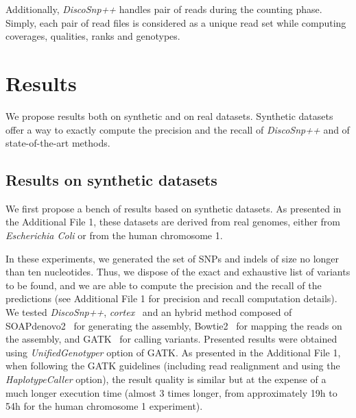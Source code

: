 \documentclass{bmcart}
\newcommand{\discopp}{{\it DiscoSnp++}\xspace}
\newcommand{\co}{{\it cortex}\xspace}
\begin{document}
Additionally, \discopp handles pair of reads during the counting phase. Simply, each pair of read files is considered as a unique read set while computing coverages, qualities, ranks and genotypes. 


\section*{Results}

We propose results both on synthetic and on real datasets. Synthetic datasets offer a way to exactly compute the precision and the recall of \discopp and of state-of-the-art methods. 

\subsection*{Results on synthetic datasets}
We first propose a bench of results based on synthetic datasets. As presented in the Additional File 1, these datasets are derived from real genomes, either from \emph{Escherichia Coli} or from the human chromosome 1. 

In these experiments, we generated the set of SNPs and indels of size no longer than ten nucleotides. 
Thus, we dispose of the exact and exhaustive list of variants to be found, and we are able to compute the precision and the recall of the predictions (see Additional File 1 for precision and recall computation details). We tested \discopp, \co~\cite{iqbal2012novo} and an hybrid method composed of SOAPdenovo2~\cite{luo2012soapdenovo2} for generating the assembly, Bowtie2~\cite{langmead2012fast} for mapping the reads on the assembly, and GATK~\cite{gatk} for calling variants. Presented results were obtained using \emph{UnifiedGenotyper} option of GATK. As presented in the Additional File 1, when following the GATK guidelines (including read realignment and using the \emph{HaplotypeCaller} option), the result quality is similar but at the expense of a much longer execution time (almost 3 times longer, from approximately 19h to 54h for the human chromosome 1 experiment). 
\end{document}
